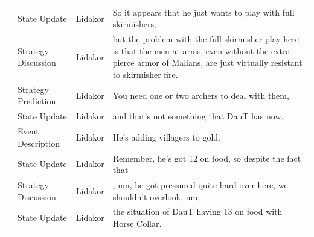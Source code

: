{\begin{longtable}{@{}>{\theAppRow}r|L{2.3cm}L{1.0cm}U{11.55cm}@{}}
    & State Update          & Lidakor & So it appears that he just wants to play with full skirmishers,                                                                                                                                                                                                                                 \\
    & Strategy Discussion   & Lidakor & but the problem with the full skirmisher play here is that the men-at-arms, even without the extra pierce armor of Malians, are just virtually resistant to skirmisher fire.                                                                                                                    \\
    & Strategy Prediction   & Lidakor & You need one or two archers to deal with them,                                                                                                                                                                                                                                                  \\
    & State Update          & Lidakor & and that's not something that DauT has now.                                                                                                                                                                                                                                                     \\
    & Event Description     & Lidakor & He's adding villagers to gold.                                                                                                                                                                                                                                                                  \\
    & State Update          & Lidakor & Remember, he's got 12 on food, so despite the fact that                                                                                                                                                                                                                                         \\
    & Strategy Discussion   & Lidakor & , um, he got pressured quite hard over here, we shouldn't overlook, um,                                                                                                                                                                                                                         \\
    & State Update          & Lidakor & the situation of DauT having 13 on food with Horse Collar.                                                                                                                                                                                                                                      \\

\end{longtable}}
